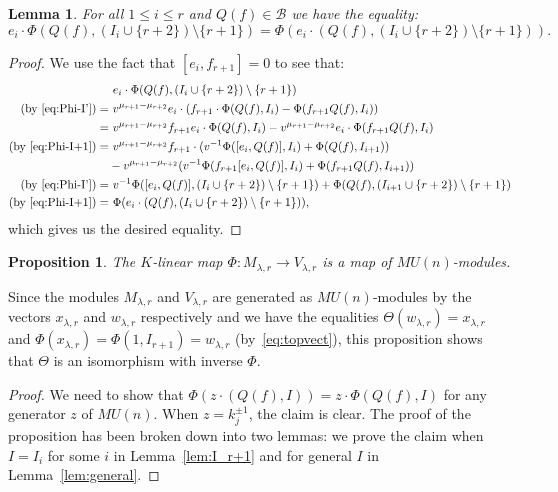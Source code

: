 \documentclass{amsart}
\numberwithin{equation}{section}
\theoremstyle{theorem}
\newtheorem{lemma}[theorem]{Lemma}
\newtheorem{proposition}[theorem]{Proposition}
\theoremstyle{definition}
\newcommand{\sm}{\setminus}
\newcommand{\bb}{\mathcal{B}}
\begin{document}
\begin{lemma}\label{lem:Phi-ei}
For all $1\leq i\leq r$ and $Q(f)\in \bb$ we have the equality:
\[e_i\cdot \Phi(Q(f), (I_{i}\cup\{r+2\})\sm \{r+1\}) =  \Phi(e_i\cdot(Q(f), (I_{i}\cup\{r+2\})\sm \{r+1\})).\]
\end{lemma}

 \begin{proof}
We use the fact that $[e_{i},f_{r+1}]=0$ to see that:
\begin{align*}
&~e_{i}\cdot \Phi(Q(f), (I_{i}\cup\{r+2\})\sm \{r+1\})\\
\text{(by \eqref{eq:Phi-I'})}=&~v^{\mu_{r+1}-\mu_{r+2}}e_{i}\cdot (f_{r+1}\cdot\Phi(Q(f), I_{i})-\Phi(f_{r+1}Q(f),I_{i}))\\
=&~v^{\mu_{r+1}-\mu_{r+2}}f_{r+1}e_{i}\cdot  \Phi(Q(f), I_{i}) - v^{\mu_{r+1}-\mu_{r+2}}e_{i}\cdot \Phi(f_{r+1}Q(f),I_{i})\\
\text{(by \eqref{eq:Phi-I+1})}=&~v^{\mu_{r+1}-\mu_{r+2}}f_{r+1}\cdot (v^{-1}\Phi([e_{i},Q(f)], I_{i}) +\Phi(Q(f),I_{i+1}))\\&-v^{\mu_{r+1}-\mu_{r+2}}(v^{-1}\Phi(f_{r+1}[e_{i},Q(f)],I_{i})+\Phi(f_{r+1}Q(f),I_{i+1}))\\
\text{(by \eqref{eq:Phi-I'})}=&~v^{-1}\Phi([e_{i},Q(f)], (I_{i}\cup\{r+2\})\sm \{r+1\})+ \Phi(Q(f), (I_{i+1}\cup\{r+2\})\sm \{r+1\})\\
\text{(by \eqref{eq:Phi-I+1})}=&~\Phi(e_{i}\cdot(Q(f), (I_{i}\cup\{r+2\})\sm \{r+1\})),
\end{align*}
which gives us the desired equality.
 \end{proof}
 
\begin{proposition}
The $K$-linear map $\Phi:M_{\lambda,r}\to V_{\lambda,r}$ is a map of $MU(n)$-modules.
\end{proposition}

Since the modules $M_{\lambda, r}$ and $V_{\lambda,r}$ are generated as $MU(n)$-modules by the vectors $x_{\lambda, r}$ and $w_{\lambda, r}$ respectively and we have the equalities $\Theta(w_{\lambda, r})=x_{\lambda, r}$ and $\Phi(x_{\lambda, r})=\Phi(1,I_{r+1})=w_{\lambda, r}$ (by~\eqref{eq:topvect}), this proposition shows that $\Theta$ is an isomorphism with inverse $\Phi$.

\begin{proof}
We need to show that $\Phi(z\cdot(Q(f), I)) = z\cdot \Phi(Q(f), I)$ for any generator $z$ of $MU(n)$. When $z=k_j^{\pm 1}$, the claim is clear. The proof of the proposition has been broken down into two lemmas: we prove the claim when $I=I_i$ for some $i$ in Lemma~\ref{lem:I_r+1} and for general $I$ in Lemma~\ref{lem:general}.
\end{proof}
\end{document}

